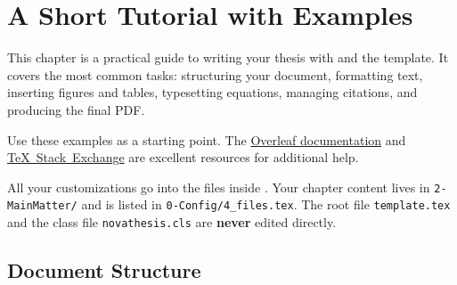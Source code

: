 

%

\makeatletter
\newcommand{\ntifpkgloaded}{\@ifpackageloaded}
\makeatother


\chapter{A Short  Tutorial with Examples}
\label{cha:a_short_latex_tutorial_with_examples}

This chapter is a practical guide to writing your thesis with  and the \novathesis{} template.
It covers the most common tasks: structuring your document, formatting text, inserting figures and tables, typesetting equations, managing citations, and producing the final PDF.

Use these examples as a starting point.
The \href{https://www.overleaf.com/learn}{Overleaf documentation} and \href{https://tex.stackexchange.com}{TeX~Stack~Exchange} are excellent resources for additional help.

\begin{warningbox}[title={Do not edit “\texttt{template.tex}” or “\texttt{novathesis.cls}”}]
  All your customizations go into the files inside .
  Your chapter content lives in \texttt{2-MainMatter/} and is listed in \texttt{0-Config/4\_files.tex}.
  The root file \texttt{template.tex} and the class file \texttt{novathesis.cls} are \textbf{never} edited directly.
\end{warningbox}


\section{Document Structure}
\label{sec:document_structure}

